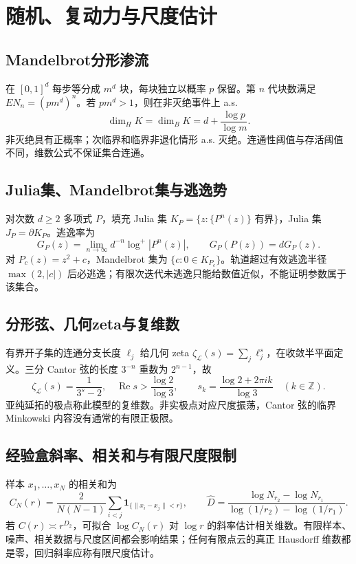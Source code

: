 \documentclass[../main.tex]{subfiles}
\begin{document}
\section{随机、复动力与尺度估计}
\subsection{Mandelbrot分形渗流}
在 $[0,1]^d$ 每步等分成 $m^d$ 块，每块独立以概率 $p$ 保留。第 $n$ 代块数满足 $EN_n=(pm^d)^n$。若 $pm^d>1$，则在非灭绝事件上 a.s.
\[
\dim_HK=\dim_BK=d+\frac{\log p}{\log m}.
\]
非灭绝具有正概率；次临界和临界非退化情形 a.s. 灭绝。连通性阈值与存活阈值不同，维数公式不保证集合连通。
\subsection{Julia集、Mandelbrot集与逃逸势}
对次数 $d\ge2$ 多项式 $P$，填充 Julia 集 $K_P=\{z:\{P^n(z)\}\text{ 有界}\}$，Julia 集 $J_P=\partial K_P$。逃逸率为
\[
G_P(z)=\lim_{n\to\infty}d^{-n}\log^+|P^n(z)|,\qquad
G_P(P(z))=dG_P(z).
\]
对 $P_c(z)=z^2+c$，Mandelbrot 集为 $\{c:0\in K_{P_c}\}$。轨道超过有效逃逸半径 $\max(2,|c|)$ 后必逃逸；有限次迭代未逃逸只能给数值近似，不能证明参数属于该集合。
\subsection{分形弦、几何zeta与复维数}
有界开子集的连通分支长度 $\ell_j$ 给几何 zeta $\zeta_{\mathcal L}(s)=\sum_j\ell_j^s$，在收敛半平面定义。三分 Cantor 弦的长度 $3^{-n}$ 重数为 $2^{n-1}$，故
\[
\zeta_{\mathcal L}(s)=\frac1{3^s-2},\quad\operatorname{Re}s>\frac{\log2}{\log3},\qquad
s_k=\frac{\log2+2\pi ik}{\log3}\quad(k\in\mathbb Z).
\]
亚纯延拓的极点称此模型的复维数。非实极点对应尺度振荡，Cantor 弦的临界 Minkowski 内容没有通常的有限正极限。
\subsection{经验盒斜率、相关和与有限尺度限制}
样本 $x_1,\ldots,x_N$ 的相关和为
\[
C_N(r)=\frac2{N(N-1)}\sum_{i<j}\bm1_{\{\|x_i-x_j\|<r\}},\qquad
\widehat D=\frac{\log N_{r_2}-\log N_{r_1}}{\log(1/r_2)-\log(1/r_1)}.
\]
若 $C(r)\asymp r^{D_2}$，可拟合 $\log C_N(r)$ 对 $\log r$ 的斜率估计相关维数。有限样本、噪声、相关数据与尺度区间都会影响结果；任何有限点云的真正 Hausdorff 维数都是零，回归斜率应称有限尺度估计。
\end{document}
